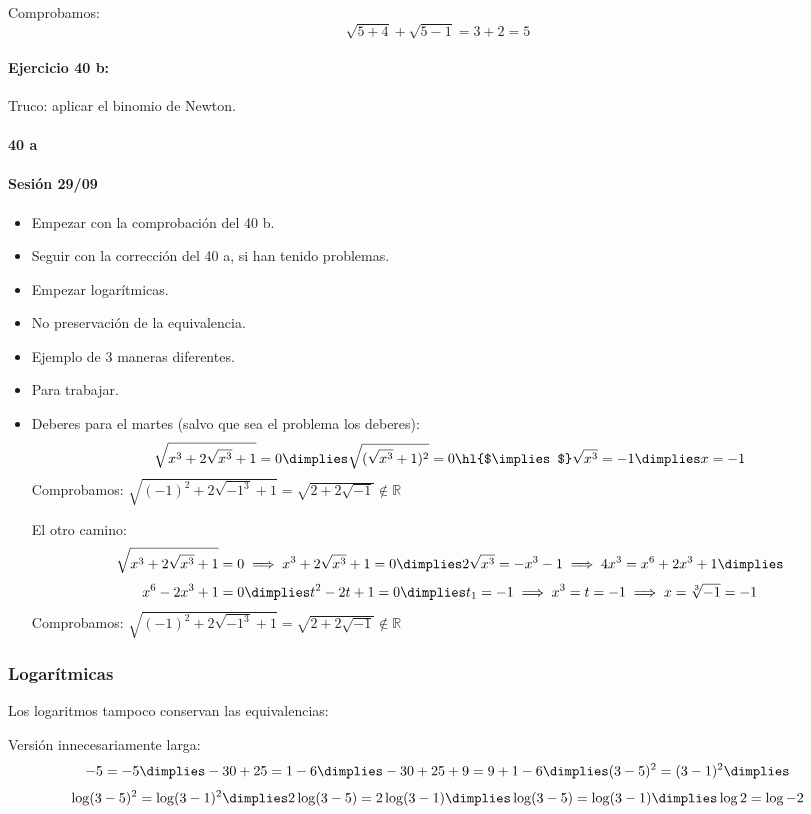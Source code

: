 Comprobamos:
\[
	\sqrt{5+4}+\sqrt{5-1} = 3+2 = 5
\]

\paragraph{Ejercicio 40 b:} Truco: aplicar el binomio de Newton.


\paragraph{40 a}

\paragraph{Sesión 29/09}
\begin{itemize}
	\item Empezar con la comprobación del 40 b.
	\item Seguir con la corrección del 40 a, si han tenido problemas.
	\item Empezar logarítmicas.
	\item No preservación de la equivalencia.
	\item Ejemplo de 3 maneras diferentes.
	\item Para trabajar.
	\item Deberes para el martes (salvo que sea el problema los deberes): 
	\[
		\sqrt{x^3+2\sqrt{x^3}+1} = 0 \dimplies \sqrt{(\sqrt{x^3}+1)^2} = 0 \text{\hl{$\implies$}} \sqrt{x^3}=-1 \dimplies x=-1
	\]
	Comprobamos: $\sqrt{(-1)^2+2\sqrt{-1^3}+1} = \sqrt{2+2\sqrt{-1}} \notin ℝ$

	El otro camino:
	\[
		\sqrt{x^3+2\sqrt{x^3}+1} = 0 \implies x^3+2\sqrt{x^3}+1 = 0 \dimplies 2\sqrt{x^3} = -x^3-1 \implies 4x^3=x^6+2x^3+1 \dimplies 
	\]
	\[
		x^6-2x^3+1=0 \dimplies t^2-2t+1=0 \dimplies t_1=-1 \implies x^3=t=-1\implies x=\sqrt[3]{-1}=-1
	\]
	Comprobamos: $\sqrt{(-1)^2+2\sqrt{-1^3}+1} = \sqrt{2+2\sqrt{-1}} \notin ℝ$

\end{itemize}

\subsubsection{Logarítmicas}

Los logaritmos tampoco conservan las equivalencias:

Versión innecesariamente larga:
\[
	-5 = -5 \dimplies -30+25 = 1-6 \dimplies -30+25+9 = 9+1-6 \dimplies (3-5)^2 = (3-1)^2 \dimplies 
\]
\[
	\log(3-5)^2 = \log(3-1)^2 \dimplies 2\log(3-5) = 2\log(3-1) \dimplies \log(3-5)=\log(3-1) \dimplies \log2=\log-2
\]

